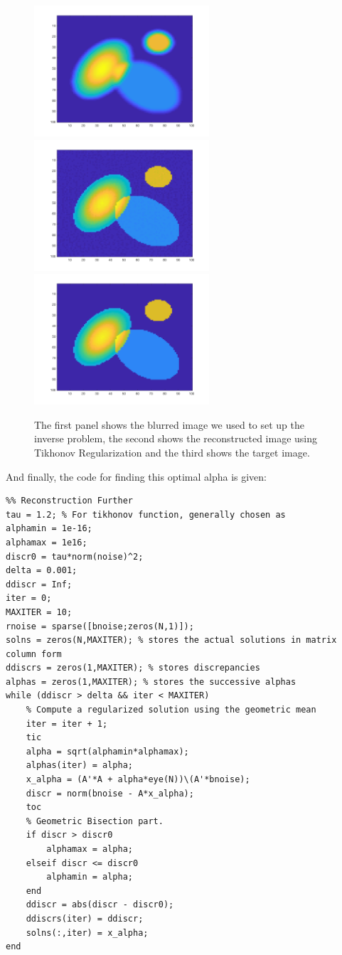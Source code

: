 \documentclass{article}
\begin{document}
\begin{figure}[H]
\centerline{
\includegraphics[width = 6.5cm]{blurredTarget.png} 
\includegraphics[width = 6.5cm]{TikhinovReconstructed.png} 
\includegraphics[width = 6.5cm]{TrueTarget.png}
}
\caption{\label{fig:Figure 6} The first panel shows the blurred image we used to set up the inverse problem, the second shows the reconstructed image using Tikhonov Regularization and the third shows the target image.}
\end{figure}

And finally, the code for finding this optimal alpha is given:

\begin{verbatim}
%% Reconstruction Further
tau = 1.2; % For tikhonov function, generally chosen as 
alphamin = 1e-16;
alphamax = 1e16;
discr0 = tau*norm(noise)^2;
delta = 0.001;
ddiscr = Inf;
iter = 0;
MAXITER = 10;
rnoise = sparse([bnoise;zeros(N,1)]);
solns = zeros(N,MAXITER); % stores the actual solutions in matrix column form
ddiscrs = zeros(1,MAXITER); % stores discrepancies
alphas = zeros(1,MAXITER); % stores the successive alphas
while (ddiscr > delta && iter < MAXITER)
    % Compute a regularized solution using the geometric mean
    iter = iter + 1;
    tic
    alpha = sqrt(alphamin*alphamax);
    alphas(iter) = alpha;
    x_alpha = (A'*A + alpha*eye(N))\(A'*bnoise);
    discr = norm(bnoise - A*x_alpha);
    toc
    % Geometric Bisection part.
    if discr > discr0
        alphamax = alpha;
    elseif discr <= discr0
        alphamin = alpha;
    end
    ddiscr = abs(discr - discr0);
    ddiscrs(iter) = ddiscr;
    solns(:,iter) = x_alpha;
end
\end{verbatim}
\end{document}
